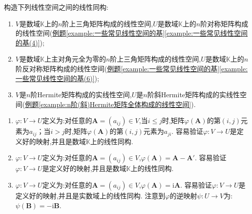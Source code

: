 \documentclass[../../main.tex]{subfiles}%
\begin{document}
\begin{example}
构造下列线性空间之间的线性同构:
\begin{enumerate}[(1)]
\item \(V\)是数域\(\mathbb{K}\)上的\(n\)阶上三角矩阵构成的线性空间,\(U\)是数域\(\mathbb{K}\)上的\(n\)阶对称矩阵构成的线性空间(\hyperref[example:一些常见线性空间的基(4)]{例题\ref{example:一些常见线性空间的基}\ref{example:一些常见线性空间的基(4)}});
\item \(V\)是数域\(\mathbb{K}\)上主对角元全为零的\(n\)阶上三角矩阵构成的线性空间,\(U\)是数域\(\mathbb{K}\)上的\(n\)阶反对称矩阵构成的线性空间(\hyperref[example:一些常见线性空间的基(6)]{例题\ref{example:一些常见线性空间的基}\ref{example:一些常见线性空间的基(6)}});
\item \(V\)是\(n\)阶Hermite矩阵构成的实线性空间,\(U\)是\(n\)阶斜Hermite矩阵构成的实线性空间(\hyperref[example:n阶(斜)Hermite矩阵全体构成的线性空间]{例题\ref{example:n阶(斜)Hermite矩阵全体构成的线性空间}}).
\end{enumerate}
\end{example}
\begin{solution}
\begin{enumerate}[(1)]
\item  \(\varphi:V\to U\)定义为:对任意的\(\boldsymbol{A}=(a_{ij})\in V\),当\(i\leqslant  j\)时,矩阵\(\varphi(\boldsymbol{A})\)的第\((i,j)\)元素为\(a_{ij}\)；当\(i > j\)时,矩阵\(\varphi(\boldsymbol{A})\)的第\((i,j)\)元素为\(a_{ji}\). 容易验证\(\varphi:V\to U\)是定义好的映射,并且是数域\(\mathbb{K}\)上的线性同构.
\item \(\varphi:V\to U\)定义为:对任意的\(\boldsymbol{A}=(a_{ij})\in V\),\(\varphi(\boldsymbol{A})=\boldsymbol{A}-\boldsymbol{A}'\). 容易验证\(\varphi:V\to U\)是定义好的映射,并且是数域\(\mathbb{K}\)上的线性同构.
\item \(\varphi:V\to U\)定义为:对任意的\(\boldsymbol{A}=(a_{ij})\in V\),\(\varphi(\boldsymbol{A})=\mathrm{i}\boldsymbol{A}\). 容易验证\(\varphi:V\to U\)是定义好的映射,并且是实数域上的线性同构. 注意到\(\varphi\)的逆映射\(\psi:U\to V\)为:\(\psi(\boldsymbol{B})=-\mathrm{i}\boldsymbol{B}\). 
\end{enumerate}

\end{solution}
\end{document}
